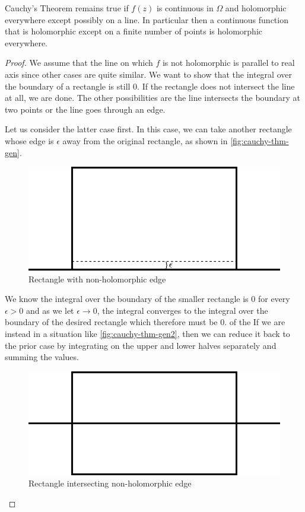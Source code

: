 \begin{corollary}\label{cor:cauchy-thm-general}
Cauchy's Theorem remains true if $f(z)$ is continuous in $\Omega$ and holomorphic everywhere except possibly on a line. In particular then a continuous function that is holomorphic except on a finite number of points is holomorphic everywhere.
\end{corollary}
\begin{proof}
    We assume that the line on which $f$ is not holomorphic is parallel to real axis since other cases are quite similar. 
    We want to show that the integral over the boundary of a rectangle is still 0. If the rectangle does not intersect the line at all, we are done. The other possibilities are the line intersects the boundary at two points or the line 
    goes through an edge. 

    Let us consider the latter case first. In this case, we can take another rectangle whose edge is $\epsilon$ away from the original rectangle, as shown in \autoref{fig:cauchy-thm-gen}. 
    \begin{figure}[ht]
        \centering
        \includegraphics{Images/cauchy_thm_gen.png}
        \caption{Rectangle with non-holomorphic edge}
        \label{fig:cauchy-thm-gen}
    \end{figure}
    We know the integral over the boundary of the smaller rectangle is 0 for every $\epsilon > 0$ and as we let $\epsilon \to 0$, the integral converges to the integral over the boundary of the desired rectangle which therefore must be 0. of the If we are instead in a situation like \autoref{fig:cauchy-thm-gen2}, then we can reduce it back to the prior case by integrating on the upper and lower halves separately and summing the values.
    \begin{figure}[ht]
        \centering
        \includegraphics{Images/cauchy_thm_gen2.png}
        \caption{Rectangle intersecting non-holomorphic edge}
        \label{fig:cauchy-thm-gen2}
    \end{figure}
\end{proof}
